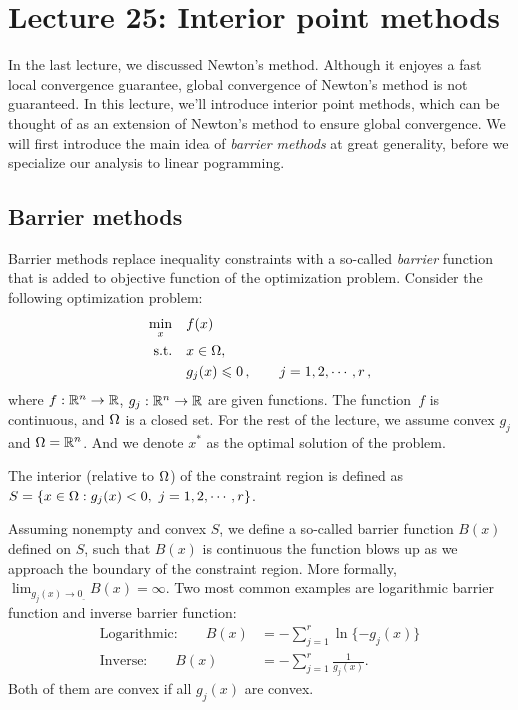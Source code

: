 \section{Lecture 25: Interior point methods}
In the last lecture, we discussed Newton's method. Although it enjoyes a fast local
convergence guarantee, global convergence of Newton's method is not guaranteed. 
In this lecture, we'll introduce interior point methods, which can be thought of
as an extension of Newton's method to ensure global convergence.  We will first
introduce the main idea of \emph{barrier methods} at great generality, before we
specialize our analysis to linear pogramming.

\subsection{Barrier methods}
Barrier methods replace inequality constraints with a so-called \emph{barrier}
function that is added to objective function of the optimization problem. 
Consider the following optimization problem: 
\begin{align*}
\min_x  &\quad f(x)\\
\text{s.t.} &\quad x\in{\Omega},\\
&\quad g_j(x)\leqslant{0}\,,\qquad j=1,2,\cdots,r\,,
\end{align*}
where $f:\mathbb{R}^n\rightarrow\mathbb{R}$, $g_j:\mathbb{R}^n\rightarrow\mathbb{R}$ are given functions. 
The function~$f$ is continuous, and $\Omega$ is a closed set. For the rest of the lecture, we assume convex $g_j$ and $\Omega=\mathbb{R}^n$. And we denote $x^*$ as the optimal solution of the problem.

\begin{definition}
The interior (relative to $\Omega$) of the constraint region is defined as $S=\{x\in\domain:g_j(x)<0,\ j=1,2,\cdots,r\}$. 
\end{definition}

Assuming nonempty and convex $S$, we define a so-called barrier function $B(x)$
defined on $S$, such that $B(x)$ is continuous the function blows up as we
approach the boundary of the constraint region. More formally,
$\lim_{g_j(x)\rightarrow{0_{\_}}}B(x)=\infty$. Two most common examples are
logarithmic barrier function and inverse barrier function: 
\begin{align}
\text{Logarithmic:}\qquad B(x) &= -\sum_{j=1}^{r}\ln\{-g_j(x)\}\\
\text{Inverse:}\qquad B(x) &= -\sum_{j=1}^{r}\frac{1}{g_j(x)}.
\end{align}
Both of them are convex if all $g_j(x)$ are convex. 

